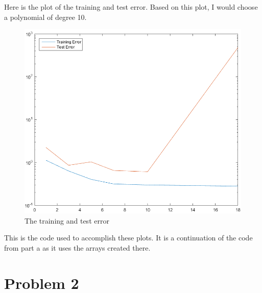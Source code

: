 \documentclass[twoside,11pt]{article}
\theoremstyle{definition}
\begin{document}
\newpage
Here is the plot of the training and test error. Based on this plot, I would choose a polynomial of degree 10.
\begin{figure}[h]
\centering
\includegraphics[width=5 in]{prob1cPlotB.png}
\caption{The training and test error}
\end{figure}

\newpage
This is the code used to accomplish these plots. It is a continuation of the code from part a as it uses the arrays created there. 


\newpage

\section*{Problem 2}
\end{document}

